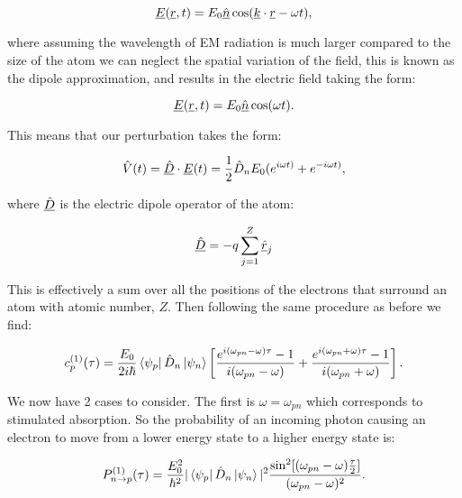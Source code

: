 \begin{equation}
    \underline{E}(\underline{r}, t) = E_0 \underline{\Hat{n}}\cos(\underline{k} \cdot \underline{r} - \omega t),
\end{equation}

\noindent where assuming the wavelength of EM radiation is much larger compared to the size of the atom we can neglect the spatial variation of the field, this is known as the dipole approximation, and results in the electric field taking the form:

\begin{equation}
    \underline{E}(\underline{r}, t) = E_0 \underline{\Hat{n}}\cos(\omega t).
    \label{DipoleApproximationElectricField}
\end{equation}

\noindent This means that our perturbation takes the form:

\begin{equation}
    \Hat{V}(t) = \underline{\Hat{D}} \cdot \underline{E}(t) = \frac{1}{2} \Hat{D}_n E_0 (e^{i\omega t)} + e^{-i\omega t)}
    \label{PerturbationEM},
\end{equation}

\noindent where $\underline{\Hat{D}}$ is the electric dipole operator of the atom:

\begin{equation}
    \underline{\Hat{D}} = -q \sum_{j = 1}^Z \underline{\Hat{r}}_j
    \label{ElectricDipoleOperator}
\end{equation}

\noindent This is effectively a sum over all the positions of the electrons that surround an atom with atomic number, $Z$. Then following the same procedure as before we find:

\begin{equation}
    c^{(1)}_p(\tau) = \frac{E_0}{2i\hbar}\bra{\psi_p} \Hat{D}_n \ket{\psi_n}\left[\frac{e^{i(\omega_{pn} - \omega)\tau} - 1}{i(\omega_{pn} - \omega)} + \frac{e^{i(\omega_{pn} + \omega)\tau} - 1}{i(\omega_{pn} + \omega)}\right].
    \label{CoefficientEM}
\end{equation}

We now have 2 cases to consider. The first is $\omega = \omega_{pn}$ which corresponds to stimulated absorption. So the probability of an incoming photon causing an electron to move from a lower energy state to a higher energy state is:

\begin{equation}
    P^{(1)}_{n\rightarrow p}(\tau) = \frac{E_0^2}{\hbar^2} |\bra{\psi_p} \Hat{D}_n \ket{\psi_n}|^2 \frac{\sin^2[(\omega_{pn} - \omega)\frac{\tau}{2}]}{(\omega_{pn} - \omega)^2}.
    \label{StimulatedAbsorption}
\end{equation}

